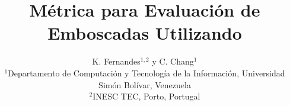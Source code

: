 \documentclass{egpubl}
\title[Ambush]%
      {M\'etrica para Evaluaci\'on de Emboscadas Utilizando \ambush}
\author[K. Fernandes \& C. Chang]
       {K. Fernandes$^{1,2}$
        y C. Chang$^{1}$
        \\
         $^1$Departamento de Computaci\'on y Tecnolog\'ia de la
         Informaci\'on, Universidad Sim\'on Bol\'ivar, Venezuela\\
         $^2$INESC TEC, Porto, Portugal
      }
\begin{document}
\noEGpagenumber

\maketitle








%



\end{document}
